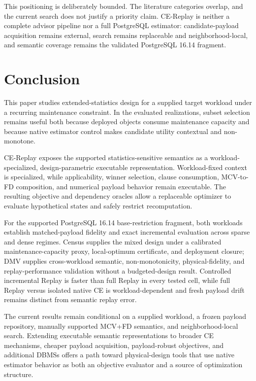 \documentclass[sigconf,nonacm]{acmart}
\begin{document}
This positioning is deliberately bounded. The literature categories overlap, and the current search does not justify a priority claim. CE-Replay is neither a complete advisor pipeline nor a full PostgreSQL estimator: candidate-payload acquisition remains external, search remains replaceable and neighborhood-local, and semantic coverage remains the validated PostgreSQL 16.14 fragment.

\section{Conclusion}\label{sec:10}

This paper studies extended-statistics design for a supplied target workload under a recurring maintenance constraint. In the evaluated realizations, subset selection remains useful both because deployed objects consume maintenance capacity and because native estimator control makes candidate utility contextual and non-monotone.

CE-Replay exposes the supported statistics-sensitive semantics as a workload-specialized, design-parametric executable representation. Workload-fixed context is specialized, while applicability, winner selection, clause consumption, MCV-to-FD composition, and numerical payload behavior remain executable. The resulting objective and dependency oracles allow a replaceable optimizer to evaluate hypothetical states and safely restrict recomputation.

For the supported PostgreSQL 16.14 base-restriction fragment, both workloads establish matched-payload fidelity and exact incremental evaluation across sparse and dense regimes. Census supplies the mixed design under a calibrated maintenance-capacity proxy, local-optimum certificate, and deployment closure; DMV supplies cross-workload semantic, non-monotonicity, physical-fidelity, and replay-performance validation without a budgeted-design result. Controlled incremental Replay is faster than full Replay in every tested cell, while full Replay versus isolated native CE is workload-dependent and fresh payload drift remains distinct from semantic replay error.

The current results remain conditional on a supplied workload, a frozen payload repository, manually supported MCV+FD semantics, and neighborhood-local search. Extending executable semantic representations to broader CE mechanisms, cheaper payload acquisition, payload-robust objectives, and additional DBMSs offers a path toward physical-design tools that use native estimator behavior as both an objective evaluator and a source of optimization structure.
\end{document}
